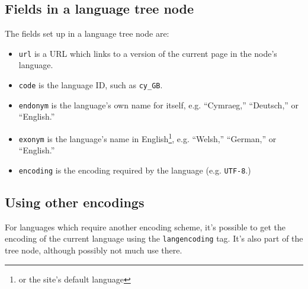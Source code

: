 \subsection{Fields in a language tree node}
The fields set up in a language tree node are:
\begin{itemize}
\item \texttt{url} is a URL which links to a version of the current page in the node's language.
\item \texttt{code} is the language ID, such as \texttt{cy\_GB}.
\item \texttt{endonym} is the language's own name for itself, e.g. ``Cymraeg,'' ``Deutsch,'' or ``English.''
\item \texttt{exonym} is the language's name in English\footnote{or the site's default
language}, e.g. ``Welsh,'' ``German,'' or ``English.''
\item \texttt{encoding} is the encoding required by the language (e.g. \texttt{UTF-8}.)
\end{itemize}

\subsection{Using other encodings}
For languages which require another encoding scheme, it's possible to get the encoding
of the current language using the \texttt{langencoding} tag. It's also part of the
tree node, although possibly not much use there.
